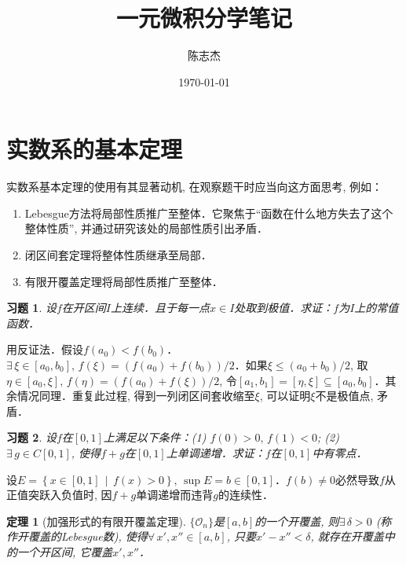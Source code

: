 \documentclass[11pt,a4paper]{ctexart}
\title{一元微积分学笔记}
\author{陈志杰}
\date{\today}
\makeatletter
\theoremstyle{thmseries} %
\newtheorem{thm}{定理}[section]
\theoremstyle{exerseries}
\newtheorem{exer}{习题}[section]
\renewenvironment{proof}[1][\proofname]{\par
  \pushQED{\qed}%
  \normalfont \topsep6\p@\@plus6\p@\relax
  \trivlist
  \item[\hskip\labelsep
        \itshape
    #1\@addpunct{}]\ignorespaces
}{%
  \popQED\endtrivlist\@endpefalse
}
\newenvironment{pf}{\begin{proof}[\bfseries\upshape 证\quad]}{\end{proof}}
\newcommand{\cbra}[1]{\mathopen{}\left\{#1\right\}}
\makeatother
\begin{document}
\maketitle
\thispagestyle{empty}
\tableofcontents
\justifying
\newpage


\section{实数系的基本定理}
实数系基本定理的使用有其显著动机, 在观察题干时应当向这方面思考, 例如：
\begin{enumerate}
	\item Lebesgue方法将局部性质推广至整体．它聚焦于``函数在什么地方失去了这个整体性质'', 并通过研究该处的局部性质引出矛盾．
	\item 闭区间套定理将整体性质继承至局部．
	\item 有限开覆盖定理将局部性质推广至整体．
\end{enumerate}

\begin{exer}
	设$f$在开区间$I$上连续．且于每一点$x\in I$处取到极值．求证：$f$为$I$上的常值函数．
\end{exer}
\begin{pf}
	用反证法．假设$f(a_0)<f(b_0)$．$\exists\,\xi\in[a_0,b_0],\,f(\xi)=(f(a_0)+f(b_0))/2$．如果$\xi\leq(a_0+b_0)/2$, 取$\eta\in[a_0,\xi],\,f(\eta)=(f(a_0)+f(\xi))/2$, 令$[a_1,b_1]=[\eta,\xi]\subseteq[a_0,b_0]$．其余情况同理．重复此过程, 得到一列闭区间套收缩至$\xi$, 可以证明$\xi$不是极值点, 矛盾．
\end{pf}

\begin{exer}
	设$f$在$[0,1]$上满足以下条件：(1) $f(0)>0,\,f(1)<0$; (2) $\exists\,g\in C[0,1]$, 使得$f+g$在$[0,1]$上单调递增．求证：$f$在$[0,1]$中有零点．
\end{exer}
\begin{pf}
	设$E=\cbra{x\in[0,1]\,\middle\vert\,f(x)>0},\,\sup E=b\in[0,1]$．$f(b)\neq0$必然导致$f$从正值突跃入负值时, 因$f+g$单调递增而违背$g$的连续性．
\end{pf}

\begin{thm}[加强形式的有限开覆盖定理]
	$\{\mathcal{O}_n\}$是$[a,b]$的一个开覆盖, 则$\exists\,\delta>0$ (称作开覆盖的Lebesgue数), 使得$\forall\,x',x''\in[a,b]$, 只要$x'-x''<\delta$, 就存在开覆盖中的一个开区间, 它覆盖$x',x''$．
\end{thm}
\end{document}
